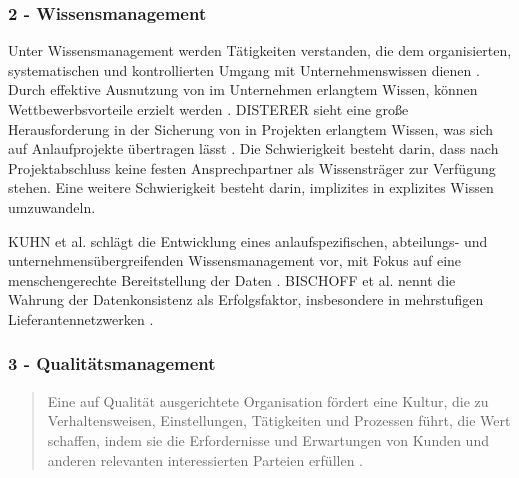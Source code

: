 \subsubsection*{2 - Wissensmanagement}

Unter Wissensmanagement werden Tätigkeiten verstanden, die dem organisierten, systematischen und kontrollierten Umgang mit Unternehmenswissen dienen \cite{Disterer2000}. Durch effektive Ausnutzung von im Unternehmen erlangtem Wissen, können Wettbewerbsvorteile erzielt werden \cite{Bischoff2007}. 
DISTERER sieht eine große Herausforderung in der Sicherung von in Projekten erlangtem Wissen, was sich auf Anlaufprojekte übertragen lässt \cite{Disterer2000}. %
Die Schwierigkeit besteht darin, dass nach Projektabschluss keine festen Ansprechpartner als Wissensträger zur Verfügung stehen. Eine weitere Schwierigkeit besteht darin, implizites in explizites Wissen umzuwandeln. 

KUHN et al. schlägt die Entwicklung eines anlaufspezifischen, abteilungs- und unternehmensübergreifenden Wissensmanagement vor, mit Fokus auf eine menschengerechte Bereitstellung der Daten \cite{Kuhn2002}. 
BISCHOFF et al. nennt die Wahrung der Datenkonsistenz als Erfolgsfaktor, insbesondere in mehrstufigen Lieferantennetzwerken \cite{Bischoff2007}. 

\subsubsection*{3 - Qualitätsmanagement}
\begin{quotation}
 Eine auf Qualität ausgerichtete Organisation fördert eine Kultur, die zu Verhaltensweisen, Einstellungen, Tätigkeiten und Prozessen führt, die Wert schaffen, indem sie die Erfordernisse und Erwartungen von Kunden und anderen relevanten interessierten Parteien erfüllen \cite[10]{ISO9000}. %
\end{quotation}


